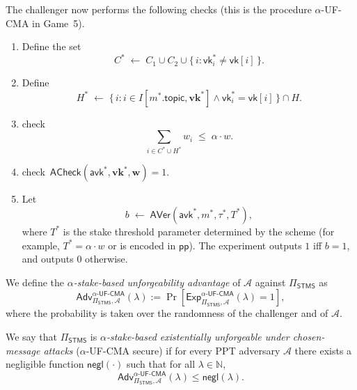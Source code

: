 \documentclass{article}
\newcommand{\vk}[0]{\mathsf{vk}}
\begin{document}
\begin{enumerate}
        The challenger now performs the following checks
        (this is the procedure $\alpha$-\textsf{UF-CMA} in Game~5).

        \begin{enumerate}
          \item Define the set
                \[
                  C^\ast
                    \;\gets\;
                    C_1 \cup C_2 \cup
                    \{\, i : \vk_i^\ast \neq \mathsf{vk}[i] \,\}.
                \]
          \item Define
                \[
                  H^\ast
                    \;\gets\;
                    \{\, i :
                        i \in I[m^\ast.\mathsf{topic},\mathbf{vk}^\ast]
                        \land \vk_i^\ast = \mathsf{vk}[i]
                     \,\} \cap H.
                \]
          \item \textsf{check}
                \[
                  \sum_{i \in C^\ast \cup H^\ast} w_i \;\le\; \alpha \cdot w.
                \]
          \item \textsf{check}\
                $\mathsf{ACheck}(\mathsf{avk}^\ast,
                                  \mathbf{vk}^\ast,\mathbf{w}) = 1$.
          \item Let
                \[
                  b \;\gets\;
                  \mathsf{AVer}(\mathsf{avk}^\ast,m^\ast,\tau^\ast,T^\ast),
                \]
                where $T^\ast$ is the stake threshold parameter determined by
                the scheme (for example, $T^\ast = \alpha\cdot w$ or is
                encoded in $\mathsf{pp}$).
                The experiment outputs $1$ iff $b=1$, and outputs $0$
                otherwise.
        \end{enumerate}
\end{enumerate}

We define the \emph{$\alpha$-stake-based unforgeability advantage} of
$\mathcal{A}$ against $\Pi_{\mathsf{STMS}}$ as
\[
  \mathsf{Adv}^{\alpha\textsf{-UF-CMA}}_{\Pi_{\mathsf{STMS}},\mathcal{A}}(\lambda)
  :=
  \Pr\!\left[
    \mathsf{Exp}^{\alpha\textsf{-UF-CMA}}_{\Pi_{\mathsf{STMS}},\mathcal{A}}(\lambda)
    = 1
  \right],
\]
where the probability is taken over the randomness of the challenger and of
$\mathcal{A}$.

  We say that $\Pi_{\mathsf{STMS}}$ is
  \emph{$\alpha$-stake-based existentially unforgeable under
  chosen-message attacks} ($\alpha$-\textsf{UF-CMA} secure) if for every PPT
  adversary $\mathcal{A}$ there exists a negligible function
  $\mathsf{negl}(\cdot)$ such that for all $\lambda \in \mathbb{N}$,
  \[
    \mathsf{Adv}^{\alpha\textsf{-UF-CMA}}_{\Pi_{\mathsf{STMS}},\mathcal{A}}(\lambda)
    \le \mathsf{negl}(\lambda).
  \]
\end{document}
